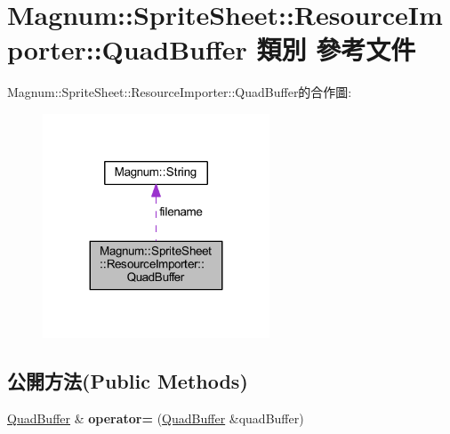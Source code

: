 \hypertarget{class_magnum_1_1_sprite_sheet_1_1_resource_importer_1_1_quad_buffer}{}\section{Magnum\+:\+:Sprite\+Sheet\+:\+:Resource\+Importer\+:\+:Quad\+Buffer 類別 參考文件}
\label{class_magnum_1_1_sprite_sheet_1_1_resource_importer_1_1_quad_buffer}


Magnum\+:\+:Sprite\+Sheet\+:\+:Resource\+Importer\+:\+:Quad\+Buffer的合作圖\+:\nopagebreak
\begin{figure}[H]
\begin{center}
\leavevmode
\includegraphics[width=191pt]{class_magnum_1_1_sprite_sheet_1_1_resource_importer_1_1_quad_buffer__coll__graph}
\end{center}
\end{figure}
\subsection*{公開方法(Public Methods)}
\begin{DoxyCompactItemize}
\item 
\hyperlink{class_magnum_1_1_sprite_sheet_1_1_resource_importer_1_1_quad_buffer}{Quad\+Buffer} \& {\bfseries operator=} (\hyperlink{class_magnum_1_1_sprite_sheet_1_1_resource_importer_1_1_quad_buffer}{Quad\+Buffer} \&quad\+Buffer)\hypertarget{class_magnum_1_1_sprite_sheet_1_1_resource_importer_1_1_quad_buffer_a67b69fb6d907b9dda03b1f4eb5434cea}{}\label{class_magnum_1_1_sprite_sheet_1_1_resource_importer_1_1_quad_buffer_a67b69fb6d907b9dda03b1f4eb5434cea}

\end{DoxyCompactItemize}
